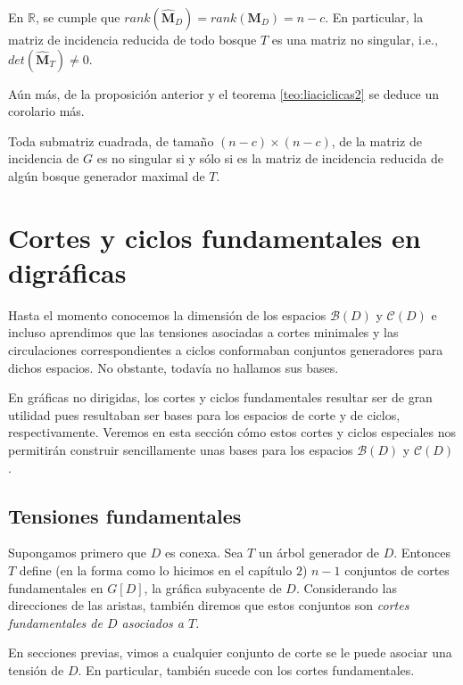 \begin{prop} \label{prop:rango2}
En $\mathbb{R}$, se cumple que $rank(\widehat{\mathbf{M}}_{D}) = rank(\mathbf{M}_{D})= n-c$. En particular, la matriz de incidencia reducida de todo bosque $T$ es una matriz no singular, i.e., $det(\widehat{\mathbf{M}}_{T}) \neq 0$.
\end{prop}

Aún más, de la proposición anterior y el teorema \ref{teo:liaciclicas2} se deduce un corolario más.

\begin{cor}
Toda submatriz cuadrada, de tamaño $(n-c) \times (n-c)$, de la matriz de incidencia de $G$ es no singular si y sólo si es la matriz de incidencia reducida de algún bosque generador maximal de $T$.
\end{cor}
 

\section{Cortes y ciclos fundamentales en digráficas}
Hasta el momento conocemos la dimensión de los espacios $\mathcal{B}(D)$ y $\mathcal{C}(D)$ e incluso aprendimos que las tensiones asociadas a cortes minimales y las circulaciones correspondientes a ciclos conformaban conjuntos generadores para dichos espacios. No obstante, todavía no hallamos sus bases. 

En gráficas no dirigidas, los cortes y ciclos fundamentales resultar ser de gran utilidad pues resultaban ser bases para los espacios de corte y de ciclos, respectivamente. Veremos en esta sección cómo estos cortes y ciclos especiales nos permitirán construir sencillamente unas bases para los espacios $\mathcal{B}(D)$ y $\mathcal{C}(D)$.

\subsection{Tensiones fundamentales}
Supongamos primero que $D$ es conexa. Sea $T$ un árbol generador de $D$. Entonces $T$ define (en la forma como lo hicimos en el capítulo $2$) $n-1$ conjuntos de cortes fundamentales en $G[D]$, la gráfica subyacente de $D$. Considerando las direcciones de las aristas, también diremos que estos conjuntos son \textit{cortes fundamentales de $D$ asociados a $T$}.

En secciones previas, vimos a cualquier conjunto de corte se le puede asociar una tensión de $D$. En particular, también sucede con los cortes fundamentales.

